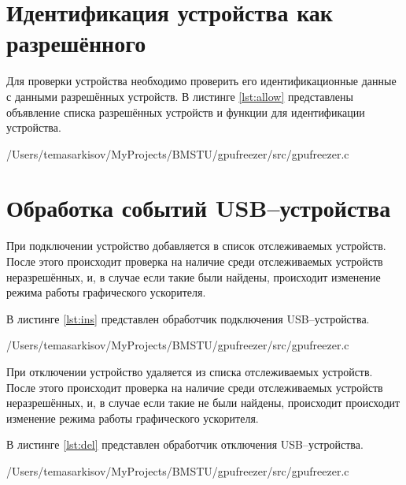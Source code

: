 \section{Идентификация устройства как разрешённого}

Для проверки устройства необходимо проверить его идентификационные данные с данными разрешённых устройств. В листинге \ref{lst:allow} представлены объявление списка разрешённых устройств и функции для идентификации устройства.

\newpage
\begin{lstinputlisting}[
	caption={Функции для идентификации устройств},
	label={lst:allow},
	style={c},
	linerange={24-26, 31-87},
	]{/Users/temasarkisov/MyProjects/BMSTU/gpufreezer/src/gpufreezer.c}
\end{lstinputlisting}

\section{Обработка событий USB--устройства}

При подключении устройство добавляется в список отслеживаемых устройств. После этого происходит проверка на наличие среди отслеживаемых устройств неразрешённых, и, в случае если такие были найдены, происходит изменение режима работы графического ускорителя.

В листинге \ref{lst:ins} представлен обработчик подключения USB--устройства.

\begin{lstinputlisting}[
	caption={Обработчик подключения USB--устройства},
	label={lst:ins},
	style={c},
	linerange={112-132},
	]{/Users/temasarkisov/MyProjects/BMSTU/gpufreezer/src/gpufreezer.c}
\end{lstinputlisting}

При отключении устройство удаляется из списка отслеживаемых устройств. После этого происходит проверка на наличие среди отслеживаемых устройств неразрешённых, и, в случае если такие не были найдены, происходит происходит изменение режима работы графического ускорителя.

В листинге \ref{lst:del} представлен обработчик отключения USB--устройства.

\begin{lstinputlisting}[
	caption={Обработчик отключения USB--устройства},
	label={lst:del},
	style={c},
	linerange={134-153},
	]{/Users/temasarkisov/MyProjects/BMSTU/gpufreezer/src/gpufreezer.c}
\end{lstinputlisting}

